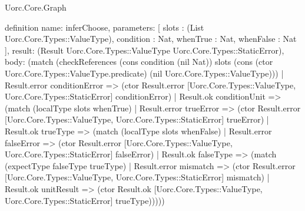 \begin{lexlean}{Uorc.Core.Graph}
\begin{semanticmodule}
definition{
  name: inferChoose,
  parameters: [
    slots : (List Uorc.Core.Types::ValueType),
    condition : Nat,
    whenTrue : Nat,
    whenFalse : Nat
  ],
  result: (Result Uorc.Core.Types::ValueType Uorc.Core.Types::StaticError),
  body: (match (checkReferences (cons condition (nil Nat)) slots (cons (ctor Uorc.Core.Types::ValueType.predicate) (nil Uorc.Core.Types::ValueType)))
    | Result.error conditionError => (ctor Result.error [Uorc.Core.Types::ValueType, Uorc.Core.Types::StaticError] conditionError)
    | Result.ok conditionUnit => (match (localType slots whenTrue)
      | Result.error trueError => (ctor Result.error [Uorc.Core.Types::ValueType, Uorc.Core.Types::StaticError] trueError)
      | Result.ok trueType => (match (localType slots whenFalse)
        | Result.error falseError => (ctor Result.error [Uorc.Core.Types::ValueType, Uorc.Core.Types::StaticError] falseError)
        | Result.ok falseType => (match (expectType falseType trueType)
          | Result.error mismatch => (ctor Result.error [Uorc.Core.Types::ValueType, Uorc.Core.Types::StaticError] mismatch)
          | Result.ok unitResult => (ctor Result.ok [Uorc.Core.Types::ValueType, Uorc.Core.Types::StaticError] trueType)))))
}


\end{semanticmodule}
\end{lexlean}
